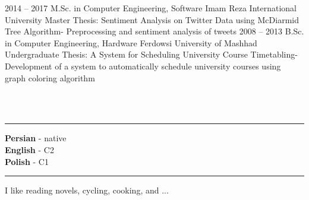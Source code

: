 \documentclass[9pt]{developercv} %
\begin{document}

    \pagebreak
	\begin{entrylist}
		\entry
		{2014 – 2017}
		{M.Sc. in Computer Engineering, Software}
		{Imam Reza International University}
		{Master Thesis: Sentiment Analysis on Twitter Data using McDiarmid Tree Algorithm- Preprocessing and sentiment analysis of tweets}
		\entry
		{2008 – 2013}
		{B.Sc. in Computer Engineering, Hardware}
		{Ferdowsi University of Mashhad}
		{Undergraduate Thesis: A System for Scheduling University Course Timetabling- Development of a system to automatically schedule university courses using graph coloring algorithm}
	\end{entrylist}
	\\\\
	\begin{minipage}[t]{0.3\textwidth}\hrule height 0pt width 0pt%
		\textbf{Persian} - native\\
		\textbf{English} - C2\\
		\textbf{Polish} - C1
	\end{minipage}%
	\hspace{0cm}
	\begin{minipage}[t]{0.3\textwidth}\hrule height 0pt width 0pt%
		I like reading novels, cycling, cooking, and ...
	\end{minipage}%
	
\end{document}
